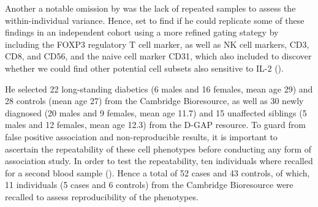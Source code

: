 Another a notable omission by \citet{Long:2010ej} was the lack of repeated samples to assess the within-individual variance.
Hence,  set to find if he could replicate some of these findings in an independent cohort
using a more refined gating stategy by including the FOXP3 regulatory T cell marker,
as well as NK cell markers, CD3, CD8, and CD56, and the naive cell marker CD31, which also included to discover whether we could find other potential cell subsets
also sensitive to IL-2 ().

He selected 22 long-standing diabetics (6 males and 16 females, mean age 29) and 28 controls (mean age 27) from the Cambridge Bioresource,
as well as 30 newly diagnosed (20 males and 9 females, mean age 11.7) and 15 unaffected siblings (5 males and 12 females, mean age 12.3) from the \Gls{D-GAP} resource.  
To guard from false positive association and non-reproducible results, 
it is important to ascertain the repeatability of these cell phenotypes before conducting any form of association study.
In order to test the repeatability, ten individuals where recalled for a second blood sample ().
Hence a total of 52 cases and 43 controls, of which, 11 individuals (5 cases and 6 controls) from the Cambridge Bioresource were recalled to assess reproducibility of the phenotypes.  


